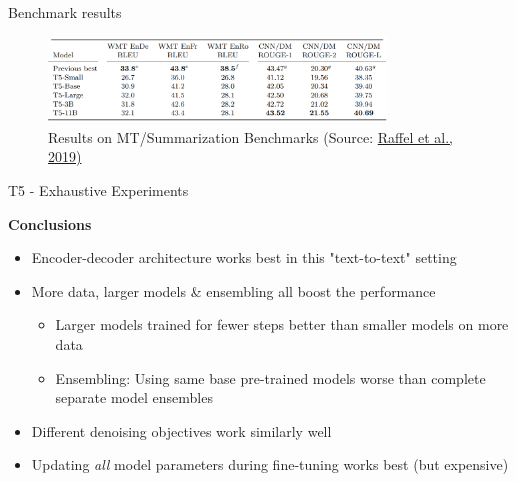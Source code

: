 \begin{frame}{Benchmark results}

\vfill

	\begin{figure}
		\centering
		\includegraphics[width = 9cm]{figure/t5-mt.png}\\ 
		\footnotesize{Results on MT/Summarization Benchmarks (Source:} \href{https://arxiv.org/pdf/1910.10683.pdf}{\footnotesize Raffel et al., 2019)}
	\end{figure}
	
\vfill

\end{frame}


\begin{frame}{T5 - Exhaustive Experiments}

\vfill
	
	\textbf{Conclusions}
	
	\begin{itemize}
		\item Encoder-decoder architecture works best in this "text-to-text" setting
		\item More data, larger models \& ensembling all boost the performance
			\begin{itemize}
				\item Larger models trained for fewer steps better than smaller models on more data
				\item Ensembling: Using same base pre-trained models worse than complete separate model ensembles
			\end{itemize}
		\item Different denoising objectives work similarly well
		\item Updating \textit{all} model parameters during fine-tuning works best (but expensive)
	\end{itemize}
	
\vfill

\end{frame}


\endlecture

